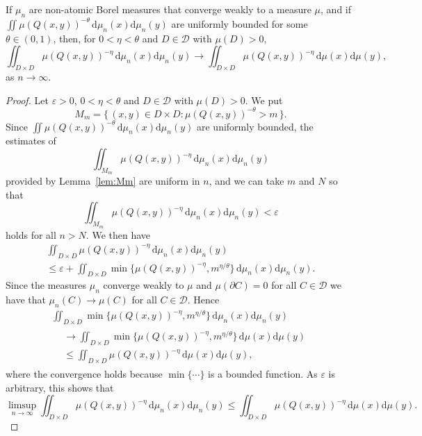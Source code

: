 \documentclass[AHL,Unicode,longabstracts]{cedram}
\newcommand*{\dd}{\mathrm{d}}
\begin{document}
\begin{coro}\label{cor:energyconvergence}
If $\mu_n$ are non-atomic Borel measures that converge weakly to a measure $\mu$, and if $\iint \mu (Q(x,y))^{-\theta} \, \dd
\mu_n (x) \dd \mu_n (y)$ are uniformly bounded for some $\theta \in (0,1)$, then, for $0 < \eta < \theta$ and $D \in
\mathscr{D}$ with $\mu (D) > 0$,
\[
\iint_{D \times D} \mu (Q(x,y))^{-\eta} \, \dd \mu_n (x)
\dd \mu_n (y) \to \iint_{D \times D} \mu (Q(x,y))^{-\eta} \,
\dd \mu (x) \dd \mu (y),
\]
as $n \to \infty$.
\end{coro}

\begin{proof}
Let $\varepsilon > 0$, $0 < \eta < \theta$ and $D \in
\mathscr{D}$ with $\mu (D) > 0$. We put
\[
M_m = \{\, (x,y) \in D \times D: \mu (Q(x,y))^{-\theta} > m \,\}.
\]
Since $\iint \mu (Q(x,y))^{-\theta} \, \dd \mu_n (x)
\dd \mu_n (y)$ are uniformly bounded, the estimates of
\[
\iint_{M_m} \mu (Q (x,y))^{-\eta} \, \dd \mu_n (x) \dd
\mu_n (y)
\]
provided by Lemma~\ref{lem:Mm} are uniform in $n$, and we can take $m$ and $N$ so that
\[
\iint_{M_m} \mu (Q (x,y))^{-\eta} \, \dd \mu_n (x) \dd
\mu_n (y) < \varepsilon
\]
holds for all $n > N$. We then have
\begin{multline*}
\iint_{D \times D} \mu (Q (x,y))^{-\eta} \, \dd\mu_n (x)
\dd\mu_n (y) \\ \leq \varepsilon + \iint_{D \times D} \min \{
\mu(Q (x,y))^{-\eta}, m^{\eta/\theta} \} \, \dd\mu_n (x)
\dd \mu_n (y).
\end{multline*}
Since the measures $\mu_n$ converge weakly to $\mu$ and $\mu (\partial C) = 0$ for all $C \in \mathscr{D}$ we have that $\mu_n (C) \to \mu (C)$ for all $C \in \mathscr{D}$. Hence
\begin{multline*}
\iint_{D \times D} \min \{ \mu(Q (x,y))^{-\eta}, m^{\eta/\theta} \} \,
\dd\mu_n (x) \dd \mu_n (y) \\
\begin{aligned}
&\to \iint_{D \times D} \min \{
\mu(Q (x,y))^{-\eta}, m^{\eta/\theta} \} \, \dd\mu (x) \dd \mu (y)\\
&\leq \iint_{D \times D} \mu(Q (x,y))^{-\eta} \, \dd \mu (x)
\dd \mu (y),
\end{aligned}
\end{multline*}
where the convergence holds because $\min \{ \cdots \}$ is a bounded function. As $\varepsilon$ is arbitrary, this shows that
\[
\limsup_{n\to \infty} \iint_{D \times D} \mu (Q (x,y))^{-\eta} \,
\dd \mu_n (x) \dd \mu_n (y) \leq \iint_{D \times D} \mu(Q (x,y))^{-\eta} \, \dd\mu (x) \dd \mu (y).
\]


\end{proof}
\end{document}
